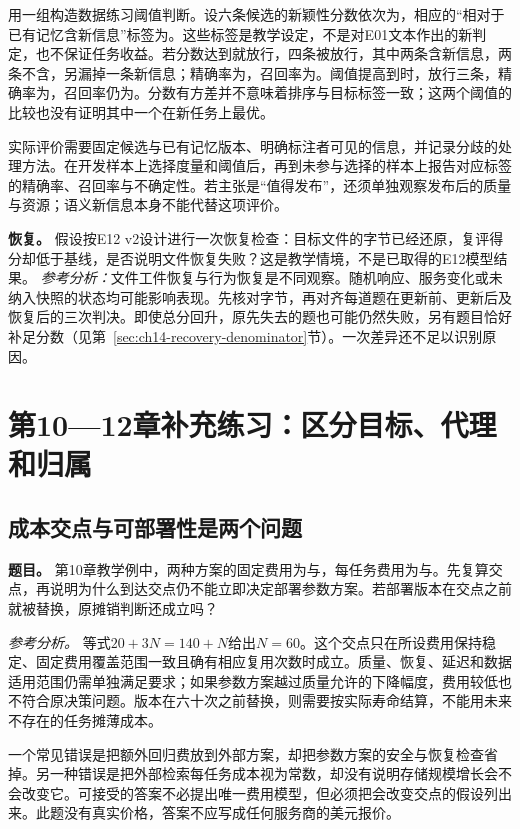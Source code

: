 用一组构造数据练习阈值判断。设六条候选的新颖性分数依次为，相应的“相对于已有记忆含新信息”标签为。这些标签是教学设定，不是对E01文本作出的新判定，也不保证任务收益。若分数达到就放行，四条被放行，其中两条含新信息，两条不含，另漏掉一条新信息；精确率为，召回率为。阈值提高到时，放行三条，精确率为，召回率仍为。分数有方差并不意味着排序与目标标签一致；这两个阈值的比较也没有证明其中一个在新任务上最优。

实际评价需要固定候选与已有记忆版本、明确标注者可见的信息，并记录分歧的处理方法。在开发样本上选择度量和阈值后，再到未参与选择的样本上报告对应标签的精确率、召回率与不确定性。若主张是“值得发布”，还须单独观察发布后的质量与资源；语义新信息本身不能代替这项评价。

\textbf{恢复。} 假设按E12 v2设计进行一次恢复检查：目标文件的字节已经还原，复评得分却低于基线，是否说明文件恢复失败？这是教学情境，不是已取得的E12模型结果。
\emph{参考分析：}文件工件恢复与行为恢复是不同观察。随机响应、服务变化或未纳入快照的状态均可能影响表现。先核对字节，再对齐每道题在更新前、更新后及恢复后的三次判决。即使总分回升，原先失去的题也可能仍然失败，另有题目恰好补足分数（见第~\ref{sec:ch14-recovery-denominator}节）。一次差异还不足以识别原因。

\section{第10—12章补充练习：区分目标、代理和归属}

\subsection{成本交点与可部署性是两个问题}

\textbf{题目。} 第10章教学例中，两种方案的固定费用为与，每任务费用为与。先复算交点，再说明为什么到达交点仍不能立即决定部署参数方案。若部署版本在交点之前就被替换，原摊销判断还成立吗？

\emph{参考分析。} 等式$20+3N=140+N$给出$N=60$。这个交点只在所设费用保持稳定、固定费用覆盖范围一致且确有相应复用次数时成立。质量、恢复、延迟和数据适用范围仍需单独满足要求；如果参数方案越过质量允许的下降幅度，费用较低也不符合原决策问题。版本在六十次之前替换，则需要按实际寿命结算，不能用未来不存在的任务摊薄成本。

一个常见错误是把额外回归费放到外部方案，却把参数方案的安全与恢复检查省掉。另一种错误是把外部检索每任务成本视为常数，却没有说明存储规模增长会不会改变它。可接受的答案不必提出唯一费用模型，但必须把会改变交点的假设列出来。此题没有真实价格，答案不应写成任何服务商的美元报价。

